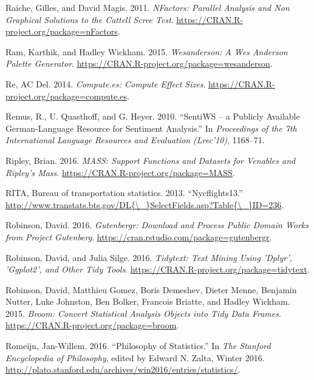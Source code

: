 \documentclass[12pt,]{book}
\begin{document}
\hypertarget{ref-R-nFactors}{}
Raiche, Gilles, and David Magis. 2011. \emph{NFactors: Parallel Analysis
and Non Graphical Solutions to the Cattell Scree Test}.
\url{https://CRAN.R-project.org/package=nFactors}.

\hypertarget{ref-R-wesanderson}{}
Ram, Karthik, and Hadley Wickham. 2015. \emph{Wesanderson: A Wes
Anderson Palette Generator}.
\url{https://CRAN.R-project.org/package=wesanderson}.

\hypertarget{ref-R-compute.es}{}
Re, AC Del. 2014. \emph{Compute.es: Compute Effect Sizes}.
\url{https://CRAN.R-project.org/package=compute.es}.

\hypertarget{ref-remquahey2010}{}
Remus, R., U. Quasthoff, and G. Heyer. 2010. ``SentiWS -- a Publicly
Available German-Language Resource for Sentiment Analysis.'' In
\emph{Proceedings of the 7th International Language Resources and
Evaluation (Lrec'10)}, 1168--71.

\hypertarget{ref-R-MASS}{}
Ripley, Brian. 2016. \emph{MASS: Support Functions and Datasets for
Venables and Ripley's Mass}.
\url{https://CRAN.R-project.org/package=MASS}.

\hypertarget{ref-nycflights13}{}
RITA, Bureau of transportation statistics. 2013. ``Nycflights13.''
\href{http://www.transtats.bts.gov/DL\%7B/_\%7DSelectFields.asp?Table\%7B/_\%7DID=236}{http://www.transtats.bts.gov/DL\{\textbackslash{}\_\}SelectFields.asp?Table\{\textbackslash{}\_\}ID=236}.

\hypertarget{ref-R-gutenbergr}{}
Robinson, David. 2016. \emph{Gutenbergr: Download and Process Public
Domain Works from Project Gutenberg}.
\url{https://cran.rstudio.com/package=gutenbergr}.

\hypertarget{ref-R-tidytext}{}
Robinson, David, and Julia Silge. 2016. \emph{Tidytext: Text Mining
Using 'Dplyr', 'Ggplot2', and Other Tidy Tools}.
\url{https://CRAN.R-project.org/package=tidytext}.

\hypertarget{ref-R-broom}{}
Robinson, David, Matthieu Gomez, Boris Demeshev, Dieter Menne, Benjamin
Nutter, Luke Johnston, Ben Bolker, Francois Briatte, and Hadley Wickham.
2015. \emph{Broom: Convert Statistical Analysis Objects into Tidy Data
Frames}. \url{https://CRAN.R-project.org/package=broom}.

\hypertarget{ref-sep-statistics}{}
Romeijn, Jan-Willem. 2016. ``Philosophy of Statistics.'' In \emph{The
Stanford Encyclopedia of Philosophy}, edited by Edward N. Zalta, Winter
2016.
\url{http://plato.stanford.edu/archives/win2016/entries/statistics/}.
\end{document}
